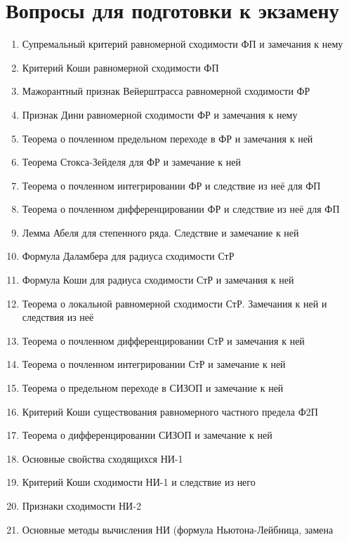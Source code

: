 \documentclass[../main.tex]{subfiles}
\begin{document}
 \chapter*{Вопросы для подготовки к экзамену}
 
 \begin{enumerate}
    \item Супремальный критерий равномерной сходимости ФП и замечания к нему
    \item Критерий Коши равномерной сходимости ФП
    \item Мажорантный признак Вейерштрасса равномерной сходимости ФР
    \item Признак Дини равномерной сходимости ФР и замечания к нему
    \item Теорема о почленном предельном переходе в ФР и замечания к ней
    \item Теорема Стокса-Зейделя для ФР и замечание к ней
    \item Теорема о почленном интегрировании ФР и следствие из неё для ФП
    \item Теорема о почленном дифференцировании ФР и следствие из неё для ФП
    \item Лемма Абеля для степенного ряда. Следствие и замечание к ней
    \item Формула Даламбера для радиуса сходимости СтР
    \item Формула Коши для радиуса сходимости СтР и замечания к ней
    \item Теорема о локальной равномерной сходимости СтР. Замечания к ней и 
    следствия из неё
    \item Теорема о почленном дифференцировании СтР и замечания к ней
    \item Теорема о почленном интегрировании СтР и замечание к ней
    \item Теорема о предельном переходе в СИЗОП и замечание к ней
    \item Критерий Коши существования равномерного частного предела Ф2П
    \item Теорема о дифференцировании СИЗОП и замечание к ней
    \item Основные свойства сходящихся НИ-1
    \item Критерий Коши сходимости НИ-1 и следствие из него
    \item Признаки сходимости НИ-2
    \item Основные методы вычисления НИ (формула Ньютона-Лейбница, замена 

\end{enumerate}
\end{document}
